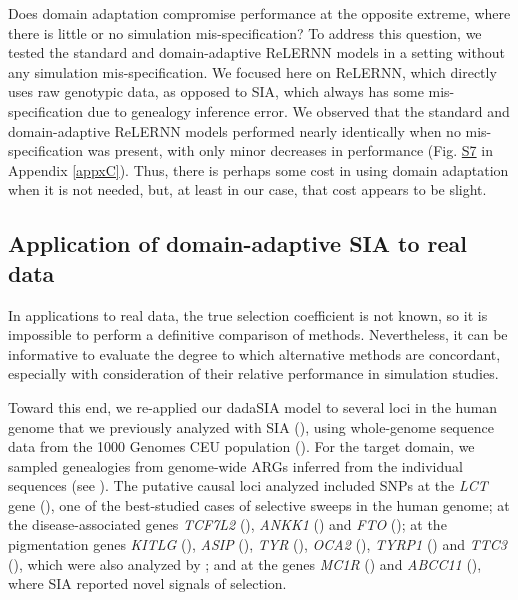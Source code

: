 Does domain adaptation compromise performance at the opposite extreme, where there is little or no simulation mis-specification? To address this question, we tested the standard and domain-adaptive ReLERNN models in a setting without any simulation mis-specification. We focused here on ReLERNN, which directly uses raw genotypic data, as opposed to SIA, which always has some mis-specification due to genealogy inference error. We observed that the standard and domain-adaptive ReLERNN models performed nearly identically when no mis-specification was present, with only minor decreases in performance (Fig. \href{https://journals.plos.org/plosgenetics/article?id=10.1371/journal.pgen.1011032#sec018}{S7} in Appendix \ref{appxC}). Thus, there is perhaps some cost in using domain adaptation when it is not needed, but, at least in our case, that cost appears to be slight.

\subsection{Application of domain-adaptive \ac{SIA} to real data}
In applications to real data, the true selection coefficient is not known, so it is impossible to perform a definitive comparison of methods. Nevertheless, it can be informative to evaluate the degree to which alternative methods are concordant, especially with consideration of their relative performance in simulation studies.

Toward this end, we re-applied our \acf{dadaSIA} model to several loci in the human genome that we previously analyzed with \ac{SIA} (\cite{hejase_deep-learning_2022}), using whole-genome sequence data from the 1000 Genomes CEU population (\cite{auton_global_2015}). For the target domain, we sampled genealogies from genome-wide \acp{ARG} inferred from the individual sequences (see ). The putative causal loci analyzed included \acp{SNP} at the \textit{LCT} gene (\cite{bersaglieri_genetic_2004}), one of the best-studied cases of selective sweeps in the human genome; at the disease-associated genes \textit{TCF7L2} (\cite{lyssenko_mechanisms_2007}), \textit{ANKK1} (\cite{spellicy_variant_2014}) and \textit{FTO} (\cite{frayling_common_2007}); at the pigmentation genes \textit{KITLG} (\cite{sulem_genetic_2007}), \textit{ASIP} (\cite{eriksson_web-based_2010}), \textit{TYR} (\cite{sulem_genetic_2007,eriksson_web-based_2010}), \textit{OCA2} (\cite{han_genome-wide_2008,sturm_single_2008}), \textit{TYRP1} (\cite{kenny_melanesian_2012}) and \textit{TTC3} (\cite{liu_digital_2010}), which were also analyzed by \cite{stern_approximate_2019}; and at the genes \textit{MC1R} (\cite{sulem_genetic_2007,han_genome-wide_2008}) and \textit{ABCC11} (\cite{yoshiura_snp_2006}), where \ac{SIA} reported novel signals of selection.

